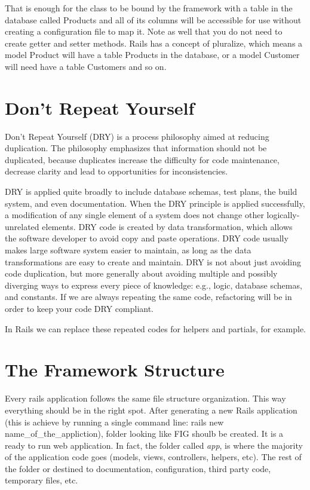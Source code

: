That is enough for the class to be bound by the framework with a table in the database called Products and all of its columns will be accessible for use without creating a configuration file to map it. Note as well that you do not need to create getter and setter methods.
Rails has a concept of pluralize, which means a model Product will have a table Products in the database, or a model Customer will need have a table Customers and so on.



\section{Don’t Repeat Yourself} 
Don’t Repeat Yourself (DRY) is a process philosophy aimed at reducing duplication. 
The philosophy emphasizes that information should not be duplicated, 
because duplicates increase the difficulty for code maintenance, 
decrease clarity and lead to opportunities for inconsistencies.

DRY is applied quite broadly to include database schemas, 
test plans, the build system, and even documentation. 
When the DRY principle is applied successfully, 
a modification of any single element of a system does not change other logically-unrelated elements.
DRY code is created by data transformation, which allows the software developer to avoid copy and paste operations.
DRY code usually makes large software system easier to maintain, 
as long as the data transformations are easy to create and maintain.
DRY is not about just avoiding code duplication, 
but more generally about avoiding multiple and possibly diverging ways to express every piece of knowledge: 
e.g., logic, database schemas, and constants.
If we are always repeating the same code, 
refactoring will be in order to keep your code DRY compliant. 

In Rails we can replace these repeated codes for helpers and partials, for example.



\section{The Framework Structure} 
Every rails application follows the same file structure organization. 
This way everything should be in the right spot.
After generating a new Rails application (this is achieve by running a single command line: rails new name\_of\_the\_appliction),
folder looking like FIG shoulb be created. 
It is a ready to run web application.
In fact, the folder called \emph{app}, 
is where the majority of the application code goes (models, views, controllers, helpers, etc).
The rest of the folder or destined to documentation, configuration, third party code, temporary files, etc.

